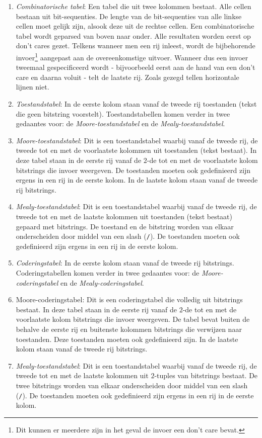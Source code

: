 \begin{enumerate}
 \item \emph{Combinatorische tabel}: Een tabel die uit twee kolommen bestaat. Alle cellen bestaan uit bit-sequenties. De lengte van de bit-sequenties van alle linkse cellen moet gelijk zijn, alsook deze uit de rechtse cellen. Een combinatorische tabel wordt geparsed van boven naar onder. Alle resultaten worden eerst op don't cares gezet. Telkens wanneer men een rij inleest, wordt de bijbehorende invoer\footnote{Dit kunnen er meerdere zijn in het geval de invoer een don't care bevat.} aangepast aan de overeenkomstige uitvoer. Wanneer dus een invoer tweemaal gespecificeerd wordt - bijvoorbeeld eerst aan de hand van een don't care en daarna voluit - telt de laatste rij. Zoals gezegd tellen horizontale lijnen niet.
 \item \emph{Toestandstabel}: In de eerste kolom staan vanaf de tweede rij toestanden (tekst die geen bitstring voorstelt). Toestandstabellen komen verder in twee gedaantes voor: de \emph{Moore-toestandstabel} en de \emph{Mealy-toestandstabel}.
 \item \emph{Moore-toestandstabel}: Dit is een toestandstabel waarbij vanaf de tweede rij, de tweede tot en met de voorlaatste kolommen uit toestanden (tekst bestaat). In deze tabel staan in de eerste rij vanaf de $2$-de tot en met de voorlaatste kolom bitstrings die invoer weergeven. De toestanden moeten ook gedefinieerd zijn ergens in een rij in de eerste kolom. In de laatste kolom staan vanaf de tweede rij bitstrings.
 \item \emph{Mealy-toestandstabel}: Dit is een toestandstabel waarbij vanaf de tweede rij, de tweede tot en met de laatste kolommen uit toestanden (tekst bestaat) gepaard met bitstrings. De toestand en de bitstring worden van elkaar onderscheiden door middel van een slash (\texttt{/}). De toestanden moeten ook gedefinieerd zijn ergens in een rij in de eerste kolom.
 \item \emph{Coderingstabel}: In de eerste kolom staan vanaf de tweede rij bitstrings. Coderingstabellen komen verder in twee gedaantes voor: de \emph{Moore-coderingstabel} en de \emph{Mealy-coderingstabel}.
 \item{Moore-coderingstabel}: Dit is een coderingstabel die volledig uit bitstrings bestaat. In deze tabel staan in de eerste rij vanaf de $2$-de tot en met de voorlaatste kolom bitstrings die invoer weergeven. De tabel bevat buiten de behalve de eerste rij en buitenste kolommen bitstrings die verwijzen naar toestanden. Deze toestanden moeten ook gedefinieerd zijn. In de laatste kolom staan vanaf de tweede rij bitstrings.
 \item \emph{Mealy-toestandstabel}: Dit is een toestandstabel waarbij vanaf de tweede rij, de tweede tot en met de laatste kolommen uit $2$-tuples van bitstrings bestaat. De twee bitstrings worden van elkaar onderscheiden door middel van een slash (\texttt{/}). De toestanden moeten ook gedefinieerd zijn ergens in een rij in de eerste kolom.
\end{enumerate}
